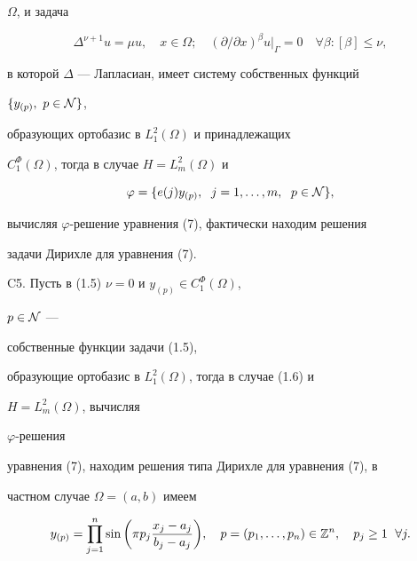$\Omega$, и задача 


\begin{equation} 


\Delta^{\nu+1}u=\mu u,\quad x\in\Omega;\quad 


(\partial/\partial x)^\beta u\big|_\Gamma=0\quad 


\forall\beta:[\beta]\le\nu, 


\end{equation} 


в которой $\Delta$ --- Лапласиан, имеет систему собственных функций 


$\{y_{(p)},\ p\in\cal N\}$, 


образующих ортобазис в $L^2_1(\Omega)$ и принадлежащих 


$C^\Phi_1(\Omega)$, тогда в случае $H=L^2_m(\Omega)$ и 


\begin{equation} 


\varphi=\{e(j)y_{(p)},\ \;j=1,\dotsc,m,\ \;p\in\cal N\}, 


\end{equation} 


вычисляя $\varphi$-решение уравнения (7), фактически находим решения 


задачи Дирихле для уравнения (7). 


\medskip 


 


C5. Пусть в (1.5) $\nu=0$ и $y_{(p)}\in C^\Phi_1(\Omega)$, 


$p\in\cal N$ --- 


собственные функции задачи (1.5), 


образующие ортобазис в $L^2_1(\Omega)$, тогда в случае (1.6) и 


$H=L^2_m(\Omega)$, вычисляя 


$\varphi$-решения 


уравнения (7), находим решения типа Дирихле для уравнения (7), в 


частном случае $\Omega=(a,b)$ имеем 


$$ 


y_{(p)}=\prod^n_{j=1}\sin\bigg(\pi p_j 


\frac{x_j-a_j}{b_j-a_j}\bigg),\quad p=(p_1,\dotsc,p_n)\in 


\Bbb Z^n,\quad p_j\ge 1\ \;\forall j. 


$$ 


 


